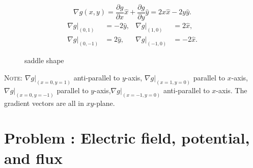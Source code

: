 \documentclass[solutions]{esg8022pset}
\begin{document}
  $$\nabla g(x,y)=\frac{\partial g}{\partial x} \hat{x} + \frac{\partial g}{\partial y} \hat{y}=2x\hat{x}-2y\hat{y}.$$
  \begin{align*}
    \nabla g|_{(0,1)} & = -2\hat{y}, & \nabla g|_{(1,0)} & = 2\hat{x}, \\
    \nabla g|_{(0,-1)} & = 2\hat{y}, & \nabla g|_{(-1,0)} & = -2\hat{x}.
  \end{align*}

  \begin{figure}[ht]
    \centering
    \caption{saddle shape}
    \label{fig:saddle}
  \end{figure}

  \noindent\textsc{Note}: $\nabla g|_{(x=0,y=1)}$ anti-parallel to $y$-axis, $\nabla
  g|_{(x=1,y=0)}$ parallel to $x$-axis, $\nabla g|_{(x=0,y=-1)}$ parallel
  to $y$-axis,$\nabla g|_{(x=-1,y=0)}$ anti-parallel to $x$-axis.  The
  gradient vectors are all in $xy$-plane.
\section{Problem \thesection: Electric field, potential, and flux}
\end{document}
